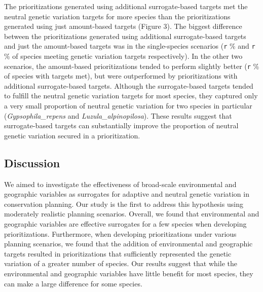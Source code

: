\documentclass[11pt,]{article}
\begin{document}
The prioritizations generated using additional surrogate-based targets
met the neutral genetic variation targets for more species than the
prioritizations generated using just amount-based targets (Figure 3).
The biggest difference between the prioritizations generated using
additional surrogate-based targets and just the amount-based targets was
in the single-species scenarios (\texttt{r} \% and \texttt{r} \% of
species meeting genetic variation targets respectively). In the other
two scenarios, the amount-based prioritizations tended to perform
slightly better (\texttt{r} \% of species with targets met), but were
outperformed by prioritizations with additional surrogate-based targets.
Although the surrogate-based targets tended to fulfill the neutral
genetic variation targets for most species, they captured only a very
small proportion of neutral genetic variation for two species in
particular (\emph{Gypsophila\_repens} and \emph{Luzula\_alpinopilosa}).
These results suggest that surrogate-based targets can substantially
improve the proportion of neutral genetic variation secured in a
prioritization.

\subsection{Discussion}\label{discussion}

We aimed to investigate the effectiveness of broad-scale environmental
and geographic variables as surrogates for adaptive and neutral genetic
variation in conservation planning. Our study is the first to address
this hypothesis using moderately realistic planning scenarios. Overall,
we found that environmental and geographic variables are effective
surrogates for a few species when developing prioritizations.
Furthermore, when developing prioritizations under various planning
scenarios, we found that the addition of environmental and geographic
targets resulted in prioritizations that sufficiently represented the
genetic variation of a greater number of species. Our results suggest
that while the environmental and geographic variables have little
benefit for most species, they can make a large difference for some
species.
\end{document}
